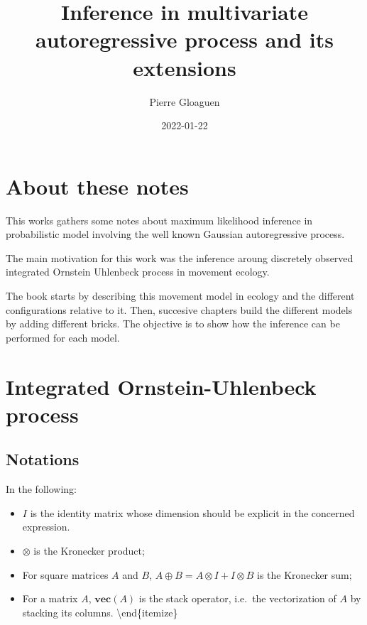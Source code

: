 \documentclass[
]{book}
\title{Inference in multivariate autoregressive process and its extensions}
\author{Pierre Gloaguen}
\date{2022-01-22}
\providecommand{\tightlist}{%
  \setlength{\itemsep}{0pt}\setlength{\parskip}{0pt}}
\newcommand{\Vect}[1]{\textbf{vec}\left(#1 \right)}
\begin{document}
\maketitle

{
\setcounter{tocdepth}{1}
\tableofcontents
}
\hypertarget{about-these-notes}{%
\chapter*{About these notes}\label{about-these-notes}}

This works gathers some notes about maximum likelihood inference in probabilistic model involving the well known Gaussian autoregressive process.

The main motivation for this work was the inference aroung discretely observed integrated Ornstein Uhlenbeck process in movement ecology.

The book starts by describing this movement model in ecology and the different configurations relative to it. Then, succesive chapters build the different models by adding different bricks.
The objective is to show how the inference can be performed for each model.

\hypertarget{integrated-ornstein-uhlenbeck-process}{%
\chapter{Integrated Ornstein-Uhlenbeck process}\label{integrated-ornstein-uhlenbeck-process}}

\hypertarget{notations}{%
\section{Notations}\label{notations}}

In the following:

\begin{itemize}
\tightlist
\item
  \(I\) is the identity matrix whose dimension should be explicit in the concerned expression.
\item
  \(\otimes\) is the Kronecker product;
\item
  For square matrices \(A\) and \(B\), \(A \oplus B = A\otimes I + I \otimes B\) is the Kronecker sum;
\item
  For a matrix \(A\), \(\Vect A\) is the stack operator, i.e.~the vectorization of \(A\) by stacking its columns.
  \textbackslash end\{itemize\}
\end{itemize}
\end{document}
